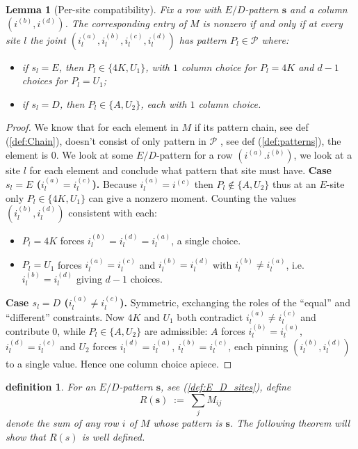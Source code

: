 \documentclass[12pt,a4paper]{article}
\newtheorem{lemma}[theorem]{Lemma}
\newtheorem{definition}[theorem]{definition}
\begin{document}
\begin{lemma}[Per-site compatibility]\label{lem:per_site_compa}
Fix a row with $E/D$-pattern $\mathbf{s}$ and a column $(i^{(b)}, i^{(d)})$.
The corresponding entry of $M$ is nonzero if and only if at every site $l$ the joint $(i_l^{(a)}, i_l^{(b)}, i_l^{(c)}, i_l^{(d)})$ has pattern $P_l\in\mathcal{P}$ where:
\begin{itemize}
\item if $s_l = E$, then $P_l \in \{4K, U_1\}$, with $1$ column choice for $P_l = 4K$ and $d-1$ choices for $P_l = U_1$;
\item if $s_l = D$, then $P_l \in \{A, U_2\}$, each with $1$ column choice.
\end{itemize}
\end{lemma}
\begin{proof}
We know that for each element in $M$  if its pattern chain, see def (\ref{def:Chain}), doesn't consist of only pattern in $\mathcal{P}$ , see def (\ref{def:patterns}), the element is $0$.
We look at some $E/D$-pattern for a row $(i^{(a)}.i^{(b)})$, we look at a site $l$  for each element and conclude what pattern that site must have.
\smallskip\noindent\textbf{Case $s_l=E$ ($i_l^{(a)}=i_l^{(c)}$).}
Because $i^{(a)}_l=i^{(c)}$  then $P_l\not\in\{A,U_2\}$ thus at an $E$-site only $P_l\in\{4K,U_1\}$ can give a nonzero moment. Counting the values $(i_l^{(b)},i_l^{(d)})$ consistent with each:
\begin{itemize}
\item $P_l=4K$ forces $i_l^{(b)}=i_l^{(d)}=i_l^{(a)}$, a single choice.
\item $P_l=U_1$ forces $i_l^{(a)}=i_l^{(c)}$ and $i_l^{(b)}=i_l^{(d)}$ with $i_l^{(b)}\neq i_l^{(a)}$, i.e.\ $i_l^{(b)}=i_l^{(d)}$ giving $d-1$ choices.
\end{itemize}

\smallskip\noindent\textbf{Case $s_l=D$ ($i_l^{(a)}\neq i_l^{(c)}$).}
Symmetric, exchanging the roles of the ``equal'' and ``different'' constraints. Now $4K$ and $U_1$ both contradict $i_l^{(a)}\neq i_l^{(c)}$ and contribute $0$, while $P_l\in\{A,U_2\}$ are admissible: $A$ forces $i_l^{(b)}=i_l^{(a)}$, $i_l^{(d)}=i_l^{(c)}$ and $U_2$ forces $i_l^{(d)}=i_l^{(a)}$, $i_l^{(b)}=i_l^{(c)}$, each pinning $(i_l^{(b)},i_l^{(d)})$ to a single value. Hence one column choice apiece.
\end{proof}

\begin{definition}
    For an $E/D$-pattern $\mathbf{s}$, see (\ref{def:E_D_sites}), define
\begin{equation}\label{eq:Rdef}
R(\mathbf{s}) \;:=\; \sum_{j} M_{ij}
\end{equation}
denote the sum of any row $i$ of $M$ whose pattern is $\mathbf{s}$.
The following theorem will show that $R(s)$  is well defined.
\end{definition}
\end{document}
